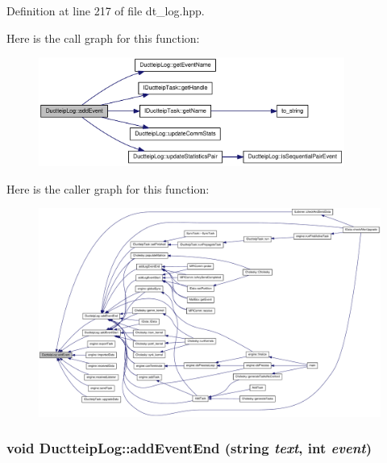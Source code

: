 Definition at line 217 of file dt\_\-log.hpp.

Here is the call graph for this function:\nopagebreak
\begin{figure}[H]
\begin{center}
\leavevmode
\includegraphics[width=284pt]{class_ductteip_log_a2038f71b600647a1899da3a0022f9fc1_cgraph}
\end{center}
\end{figure}


Here is the caller graph for this function:\nopagebreak
\begin{figure}[H]
\begin{center}
\leavevmode
\includegraphics[width=420pt]{class_ductteip_log_a2038f71b600647a1899da3a0022f9fc1_icgraph}
\end{center}
\end{figure}
\hypertarget{class_ductteip_log_a0a536783ee78831d30dc9dd6d41a674f}{
\subsubsection[{addEventEnd}]{\setlength{\rightskip}{0pt plus 5cm}void DuctteipLog::addEventEnd (string {\em text}, \/  int {\em event})}}
\label{class_ductteip_log_a0a536783ee78831d30dc9dd6d41a674f}


